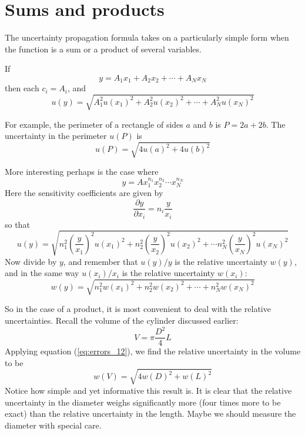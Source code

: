 \documentclass[justified]{tufte-handout}
\begin{document}
\section{Sums and products}

The uncertainty propagation formula takes on a particularly simple
form when the function is a sum or a product of several variables.

If
\begin{equation}
  \label{eq:errors_7}
  y=A_1x_1+A_2x_2+\cdots +A_Nx_N
\end{equation}
then each $c_i=A_i$, and 
\begin{equation}
  \label{eq:errors_8}
  u(y)=\sqrt{A_1^2u(x_1)^2+A_2^2u(x_2)^2+\cdots +A_N^2u(x_N)^2}
\end{equation}

For example, the perimeter of a rectangle of sides $a$ and $b$ is
$P=2a+2b$. The uncertainty in the perimeter $u(P)$ is
\begin{equation}
  \label{eq:errors_8_1}
  u(P)=\sqrt{4u(a)^2+4u(b)^2}
\end{equation}

More interesting perhaps is the case where
\begin{equation}
  \label{eq:errors_9}
  y=Ax_1^{n_1}x_2^{n_2}\cdots x_N^{n_N}
\end{equation}
Here the sensitivity coefficients are given by
\begin{equation}
  \label{eq:errors_10}
  \frac{\partial y}{\partial x_i}=n_i\frac{y}{x_i}
\end{equation}
so that
\begin{equation}
  \label{eq:errors_11}
  u(y)=\sqrt{n_1^2\left(\frac{y}{x_1}\right)^2u(x_1)^2+n_2^2\left(\frac{y}{x_2}\right)^2u(x_2)^2+\cdots
  n_N^2\left(\frac{y}{x_N}\right)^2u(x_N)^2}
\end{equation}
Now divide by $y$, and remember that $u(y)/y$ is the relative
uncertainty $w(y)$, and in the same way $u(x_i)/x_i$ is the relative
uncertainty $w(x_i)$:
\begin{equation}
  \label{eq:errors_12}
  w(y)=\sqrt{n_1^2w(x_1)^2+n_2^2w(x_2)^2+\cdots +n_N^2w(x_N)^2}
\end{equation}

So in the case of a product, it is most convenient to deal with the
relative uncertainties. Recall the volume of the cylinder discussed
earlier:
\begin{equation}
  \label{eq:errors_13}
    V=\pi\frac{D^2}{4}L
\end{equation}
Applying equation (\ref{eq:errors_12}), we find the relative
uncertainty in the volume to be
\begin{equation}
  \label{eq:errors_14}
  w(V)=\sqrt{4w(D)^2+w(L)^2}
\end{equation}
Notice how simple and yet informative this result is. It is clear that the
relative uncertainty in the diameter weighs significantly more (four
times more to be exact) than the relative uncertainty in the
length. Maybe we should measure the diameter with special care. 
\end{document}
